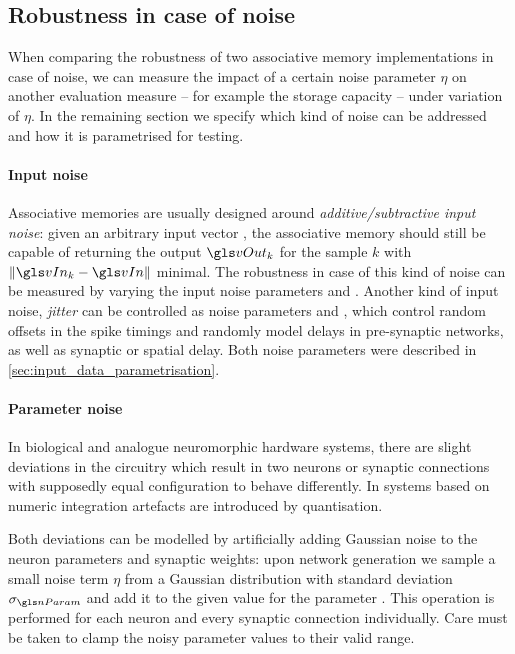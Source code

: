 \subsection{Robustness in case of noise}
\label{sec:eval_robustness}

When comparing the robustness of two associative memory implementations in case of noise, we can measure the impact of a certain noise parameter $\eta$ on another evaluation measure -- for example the storage capacity -- under variation of $\eta$. In the remaining section we specify which kind of noise can be addressed and how it is parametrised for testing.

\paragraph{Input noise}
Associative memories are usually designed around \emph{additive/subtractive input noise}: given an arbitrary input vector \vIn, the associative memory should still be capable of returning the output $\vOut_k$ for the sample $k$ with $\| \vIn_k - \vIn \|$ minimal. The robustness in case of this kind of noise can be measured by varying the input noise parameters \pFn and \pFp. Another kind of input noise, \emph{jitter} can be controlled as noise parameters \jitter and \jitterOffs, which control random offsets in the spike timings and randomly model delays in pre-synaptic networks, as well as synaptic or spatial delay. Both noise parameters were described in \cref{sec:input_data_parametrisation}.

\paragraph{Parameter noise}
In biological and analogue neuromorphic hardware systems, there are slight deviations in the circuitry which result in two neurons or synaptic connections with supposedly equal configuration to behave differently. In systems based on numeric integration artefacts are introduced by quantisation.

Both deviations can be modelled by artificially adding Gaussian noise to the neuron parameters and synaptic weights: upon network generation we sample a small noise term $\eta$ from a Gaussian distribution with standard deviation $\sigma_{\nParam}$ and add it to the given value for the parameter \nParam. This operation is performed for each neuron and every synaptic connection individually. Care must be taken to clamp the noisy parameter values to their valid range.

